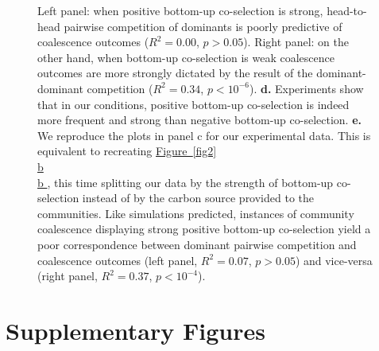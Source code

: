 \documentclass[a4paper,10pt]{article}
\newcommand{\figref}[2][]{%
  \hyperref[{#2}]{%
    Figure~\ref*{#2}%
    \ifx\\#1\\%
    \else
      #1%
    \fi
  }%
}
\begin{document}
\begin{figure}[!h]
{Left panel: when positive bottom-up co-selection is strong, head-to-head pairwise competition of dominants
is poorly predictive of coalescence outcomes
($R^2=0.00$, $p>0.05$).
Right panel: on the other hand, when bottom-up co-selection is weak coalescence outcomes are more
strongly dictated by the result of the dominant-dominant competition
($R^2=0.34$, $p<10^{-6}$).
\textbf{d.} Experiments show that in our conditions, positive bottom-up co-selection is indeed more
frequent and strong than negative bottom-up co-selection.
\textbf{e.} We reproduce the plots in panel c for our experimental data. This is equivalent to recreating
\figref[b]{fig2}, this time splitting our data by the strength of bottom-up co-selection
instead of by the carbon source provided to the communities.
Like simulations predicted, instances of community coalescence displaying strong positive bottom-up co-selection
yield a poor correspondence between dominant pairwise competition and coalescence outcomes
(left panel, $R^2=0.07$, $p>0.05$)
and vice-versa
(right panel, $R^2=0.37$, $p<10^{-4}$).}
\label{fig3}
\end{figure}

\clearpage

\section*{Supplementary Figures}

\renewcommand{\thefigure}{S\arabic{figure}}
\setcounter{figure}{0} 
\end{document}
